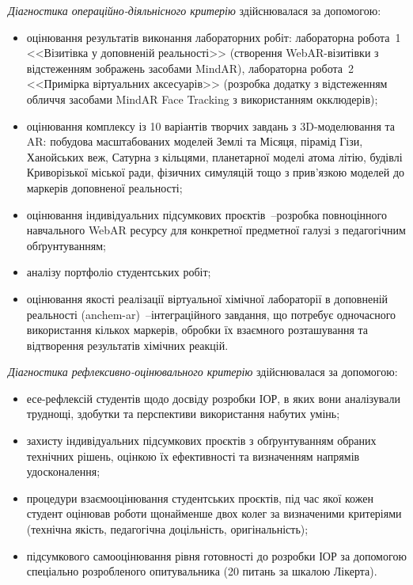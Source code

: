 \textit{Діагностика операційно-діяльнісного критерію} здійснювалася за допомогою:
\begin{itemize}
\item оцінювання результатів виконання лабораторних робіт: лабораторна робота~1 <<Візитівка у доповненій реальності>> (створення WebAR-візитівки з відстеженням зображень засобами MindAR), лабораторна робота~2 <<Примірка віртуальних аксесуарів>> (розробка додатку з відстеженням обличчя засобами MindAR Face Tracking з використанням окклюдерів);
\item оцінювання комплексу із 10 варіантів творчих завдань з 3D-моделювання та AR: побудова масштабованих моделей Землі та Місяця, пірамід Гізи, Ханойських веж, Сатурна з кільцями, планетарної моделі атома літію, будівлі Криворізької міської ради, фізичних симуляцій тощо з прив'язкою моделей до маркерів доповненої реальності;
\item оцінювання індивідуальних підсумкових проєктів~--розробка повноцінного навчального WebAR ресурсу для конкретної предметної галузі з педагогічним обґрунтуванням;
\item аналізу портфоліо студентських робіт;
\item оцінювання якості реалізації віртуальної хімічної лабораторії в доповненій реальності (anchem-ar)~--інтеграційного завдання, що потребує одночасного використання кількох маркерів, обробки їх взаємного розташування та відтворення результатів хімічних реакцій.
\end{itemize}

\textit{Діагностика рефлексивно-оцінювального критерію} здійснювалася за допомогою:
\begin{itemize}
\item есе-рефлексій студентів щодо досвіду розробки ІОР, в яких вони аналізували труднощі, здобутки та перспективи використання набутих умінь;
\item захисту індивідуальних підсумкових проєктів з обґрунтуванням обраних технічних рішень, оцінкою їх ефективності та визначенням напрямів удосконалення;
\item процедури взаємооцінювання студентських проєктів, під час якої кожен студент оцінював роботи щонайменше двох колег за визначеними критеріями (технічна якість, педагогічна доцільність, оригінальність);
\item підсумкового самооцінювання рівня готовності до розробки ІОР за допомогою спеціально розробленого опитувальника (20 питань за шкалою Лікерта).
\end{itemize}

